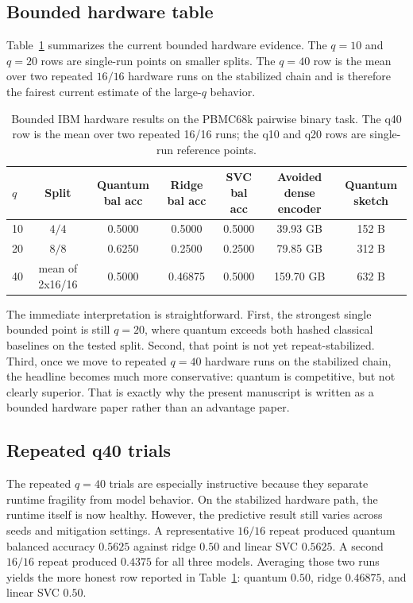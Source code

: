 \documentclass[11pt]{article}
\begin{document}
\subsection{Bounded hardware table}

Table~\ref{tab:bounded-results} summarizes the current bounded hardware evidence. The $q=10$ and $q=20$ rows are single-run points on smaller splits. The $q=40$ row is the mean over two repeated $16/16$ hardware runs on the stabilized chain and is therefore the fairest current estimate of the large-$q$ behavior.

\begin{table}[t]
\centering
\caption{Bounded IBM hardware results on the PBMC68k pairwise binary task. The q40 row is the mean over two repeated 16/16 runs; the q10 and q20 rows are single-run reference points.}
\label{tab:bounded-results}
\small
\begin{tabular}{@{}lcccccc@{}}
\toprule
$q$ & Split & Quantum bal acc & Ridge bal acc & SVC bal acc & Avoided dense encoder & Quantum sketch \\
\midrule
10 & $4/4$ & 0.5000 & 0.5000 & 0.5000 & 39.93 GB & 152 B \\
20 & $8/8$ & 0.6250 & 0.2500 & 0.2500 & 79.85 GB & 312 B \\
40 & mean of 2x16/16 & 0.5000 & 0.46875 & 0.5000 & 159.70 GB & 632 B \\
\bottomrule
\end{tabular}
\end{table}

The immediate interpretation is straightforward. First, the strongest single bounded point is still $q=20$, where quantum exceeds both hashed classical baselines on the tested split. Second, that point is not yet repeat-stabilized. Third, once we move to repeated $q=40$ hardware runs on the stabilized chain, the headline becomes much more conservative: quantum is competitive, but not clearly superior. That is exactly why the present manuscript is written as a bounded hardware paper rather than an advantage paper.

\subsection{Repeated q40 trials}

The repeated $q=40$ trials are especially instructive because they separate runtime fragility from model behavior. On the stabilized hardware path, the runtime itself is now healthy. However, the predictive result still varies across seeds and mitigation settings. A representative $16/16$ repeat produced quantum balanced accuracy $0.5625$ against ridge $0.50$ and linear SVC $0.5625$. A second $16/16$ repeat produced $0.4375$ for all three models. Averaging those two runs yields the more honest row reported in Table~\ref{tab:bounded-results}: quantum $0.50$, ridge $0.46875$, and linear SVC $0.50$.
\end{document}
